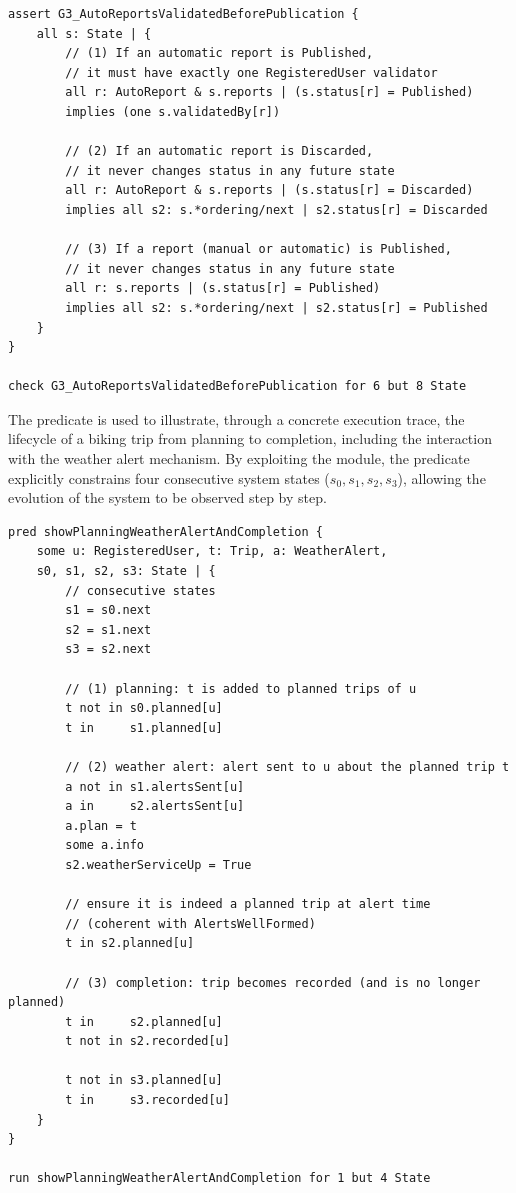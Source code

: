 \begin{lstlisting}[caption=Assertion for Goal G3.]
assert G3_AutoReportsValidatedBeforePublication {
    all s: State | {    
        // (1) If an automatic report is Published, 
        // it must have exactly one RegisteredUser validator
        all r: AutoReport & s.reports | (s.status[r] = Published) 
        implies (one s.validatedBy[r])
    
        // (2) If an automatic report is Discarded, 
        // it never changes status in any future state
        all r: AutoReport & s.reports | (s.status[r] = Discarded) 
        implies all s2: s.*ordering/next | s2.status[r] = Discarded
    
        // (3) If a report (manual or automatic) is Published, 
        // it never changes status in any future state
        all r: s.reports | (s.status[r] = Published) 
        implies all s2: s.*ordering/next | s2.status[r] = Published
    }
}

check G3_AutoReportsValidatedBeforePublication for 6 but 8 State    
\end{lstlisting}

The predicate  is used to illustrate, through a concrete execution trace, the lifecycle of a biking trip from planning to completion, including the interaction with the weather alert mechanism. By exploiting the  module, the predicate explicitly constrains four consecutive system states ($s_0, s_1, s_2, s_3$), allowing the evolution of the system to be observed step by step.

\begin{lstlisting}[caption=Predicate showing Trip Lifecycle.]
pred showPlanningWeatherAlertAndCompletion {
    some u: RegisteredUser, t: Trip, a: WeatherAlert, 
    s0, s1, s2, s3: State | {
        // consecutive states
        s1 = s0.next
        s2 = s1.next
        s3 = s2.next
        
        // (1) planning: t is added to planned trips of u
        t not in s0.planned[u]
        t in     s1.planned[u]
        
        // (2) weather alert: alert sent to u about the planned trip t
        a not in s1.alertsSent[u]
        a in     s2.alertsSent[u]
        a.plan = t
        some a.info
        s2.weatherServiceUp = True
        
        // ensure it is indeed a planned trip at alert time 
        // (coherent with AlertsWellFormed)
        t in s2.planned[u]
        
        // (3) completion: trip becomes recorded (and is no longer planned)
        t in     s2.planned[u]
        t not in s2.recorded[u]
        
        t not in s3.planned[u]
        t in     s3.recorded[u]
    }
}

run showPlanningWeatherAlertAndCompletion for 1 but 4 State
\end{lstlisting}

